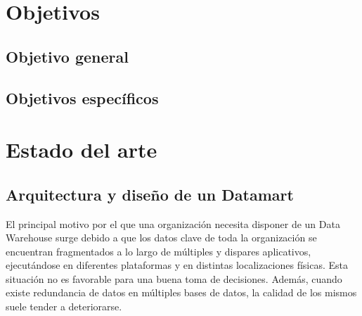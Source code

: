 \documentclass[a4paper, 12pt]{book}
\begin{document}

\cleardoublepage
\chapter{Objetivos}
\label{chap:objetivos}

\section{Objetivo general}
\label{sec:objetivo-general}


\section{Objetivos específicos}
\label{sec:objetivos-especificos}






\cleardoublepage
\chapter{Estado del arte}

\section{Arquitectura y diseño de un Datamart} 
\label{sec:datamart}
El principal motivo por el que una organización necesita disponer de un Data Warehouse surge debido a que los datos clave de toda la organización se encuentran fragmentados a lo largo de múltiples y dispares aplicativos, ejecutándose en diferentes plataformas y en distintas localizaciones físicas. Esta situación no es favorable para una buena toma de decisiones. Además, cuando existe redundancia de datos en múltiples bases de datos, la calidad de los mismos suele tender a deteriorarse.
\end{document}
